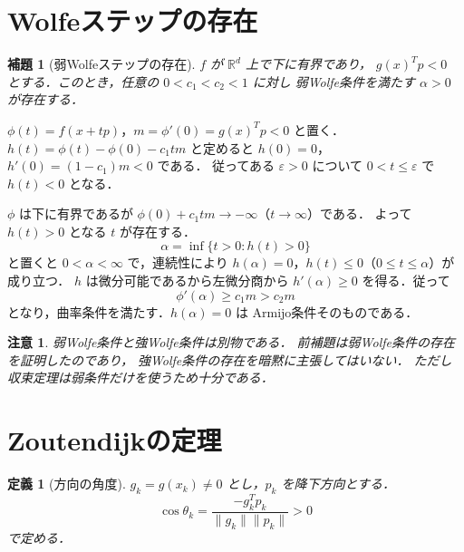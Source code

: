 \documentclass[a5paper,10pt,onecolumn]{jsarticle}
\makeatletter
\theoremstyle{mathnotetheorem}
\newtheorem{definition}[theorem]{定義}
\newtheorem{lemma}[theorem]{補題}
\newtheorem{remark}[theorem]{注意}
\renewcommand{\proofname}{証明}
\renewenvironment{proof}[1][\proofname]{%
  \par\pushQED{\qed}\normalfont\topsep4\p@\@plus2\p@\relax
  \trivlist\item[\hskip\labelsep\bfseries #1]\ignorespaces
}{\popQED\endtrivlist\@endpefalse}
\newcommand{\norm}[1]{\lVert #1\rVert}
\makeatother
\begin{document}
\section{Wolfeステップの存在}
\begin{lemma}[弱Wolfeステップの存在]\label{lem:wolfeexist}
$f$ が $\mathbb R^d$ 上で下に有界であり，
$g(x)^Tp<0$ とする．このとき，任意の $0<c_1<c_2<1$ に対し
弱Wolfe条件を満たす $\alpha>0$ が存在する．
\end{lemma}
\begin{proof}
$\phi(t)=f(x+tp)$，$m=\phi'(0)=g(x)^Tp<0$ と置く．
$h(t)=\phi(t)-\phi(0)-c_1tm$ と定めると
$h(0)=0$，$h'(0)=(1-c_1)m<0$ である．
従ってある $\varepsilon>0$ について
$0<t\le\varepsilon$ で $h(t)<0$ となる．

$\phi$ は下に有界であるが
$\phi(0)+c_1tm\to-\infty$（$t\to\infty$）である．
よって $h(t)>0$ となる $t$ が存在する．
\[
 \alpha=\inf\{t>0:h(t)>0\}
\]
と置くと $0<\alpha<\infty$ で，連続性により
$h(\alpha)=0$，$h(t)\le0$（$0\le t\le\alpha$）が成り立つ．
$h$ は微分可能であるから左微分商から
$h'(\alpha)\ge0$ を得る．従って
\[
 \phi'(\alpha)\ge c_1m>c_2m
\]
となり，曲率条件を満たす．$h(\alpha)=0$ は
Armijo条件そのものである．
\end{proof}

\begin{remark}
弱Wolfe条件と強Wolfe条件は別物である．
前補題は弱Wolfe条件の存在を証明したのであり，
強Wolfe条件の存在を暗黙に主張してはいない．
ただし収束定理は弱条件だけを使うため十分である．
\end{remark}

\section{Zoutendijkの定理}
\begin{definition}[方向の角度]
$g_k=g(x_k)\ne0$ とし，$p_k$ を降下方向とする．
\[
 \cos\theta_k=\frac{-g_k^Tp_k}{\norm{g_k}\norm{p_k}}>0
\]
で定める．
\end{definition}
\end{document}
